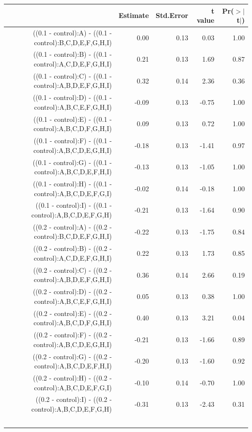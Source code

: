 \documentclass[12pt]{article}\usepackage[]{graphicx}\usepackage[]{color}
\begin{document}
\begin{table}[ht]
\centering
{\small
\begin{tabular}{rrrrr}
  \hline
 & Estimate & Std.Error & t value & Pr($>$$|$t$|$) \\ 
  \hline
((0.1 - control):A) - ((0.1 - control):B,C,D,E,F,G,H,I) & 0.00 & 0.13 & 0.03 & 1.00 \\ 
  ((0.1 - control):B) - ((0.1 - control):A,C,D,E,F,G,H,I) & 0.21 & 0.13 & 1.69 & 0.87 \\ 
  ((0.1 - control):C) - ((0.1 - control):A,B,D,E,F,G,H,I) & 0.32 & 0.14 & 2.36 & 0.36 \\ 
  ((0.1 - control):D) - ((0.1 - control):A,B,C,E,F,G,H,I) & -0.09 & 0.13 & -0.75 & 1.00 \\ 
  ((0.1 - control):E) - ((0.1 - control):A,B,C,D,F,G,H,I) & 0.09 & 0.13 & 0.72 & 1.00 \\ 
  ((0.1 - control):F) - ((0.1 - control):A,B,C,D,E,G,H,I) & -0.18 & 0.13 & -1.41 & 0.97 \\ 
  ((0.1 - control):G) - ((0.1 - control):A,B,C,D,E,F,H,I) & -0.13 & 0.13 & -1.05 & 1.00 \\ 
  ((0.1 - control):H) - ((0.1 - control):A,B,C,D,E,F,G,I) & -0.02 & 0.14 & -0.18 & 1.00 \\ 
  ((0.1 - control):I) - ((0.1 - control):A,B,C,D,E,F,G,H) & -0.21 & 0.13 & -1.64 & 0.90 \\ 
  ((0.2 - control):A) - ((0.2 - control):B,C,D,E,F,G,H,I) & -0.22 & 0.13 & -1.75 & 0.84 \\ 
  ((0.2 - control):B) - ((0.2 - control):A,C,D,E,F,G,H,I) & 0.22 & 0.13 & 1.73 & 0.85 \\ 
  ((0.2 - control):C) - ((0.2 - control):A,B,D,E,F,G,H,I) & 0.36 & 0.14 & 2.66 & 0.19 \\ 
  ((0.2 - control):D) - ((0.2 - control):A,B,C,E,F,G,H,I) & 0.05 & 0.13 & 0.38 & 1.00 \\ 
  ((0.2 - control):E) - ((0.2 - control):A,B,C,D,F,G,H,I) & 0.40 & 0.13 & 3.21 & 0.04 \\ 
  ((0.2 - control):F) - ((0.2 - control):A,B,C,D,E,G,H,I) & -0.21 & 0.13 & -1.66 & 0.89 \\ 
  ((0.2 - control):G) - ((0.2 - control):A,B,C,D,E,F,H,I) & -0.20 & 0.13 & -1.60 & 0.92 \\ 
  ((0.2 - control):H) - ((0.2 - control):A,B,C,D,E,F,G,I) & -0.10 & 0.14 & -0.70 & 1.00 \\ 
  ((0.2 - control):I) - ((0.2 - control):A,B,C,D,E,F,G,H) & -0.31 & 0.13 & -2.43 & 0.31 \\ 
$$
\end{tabular}}
\end{table}
\end{document}
